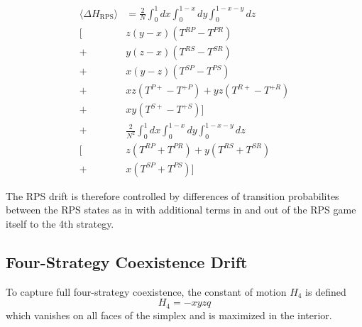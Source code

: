 \documentclass[%
 reprint,
 amsmath,amssymb,
 aps,
]{revtex4-2}
\begin{document}
\begin{align}
\langle \Delta H_{\mathrm{RPS}} \rangle
&= \frac{2}{N} \int_{0}^{1}dx 
\int_{0}^{1-x}dy
\int_{0}^{1-x-y}dz \nonumber\\
\Big[ 
&z (y-x) (T^{RP} - T^{PR}) \nonumber\\
+& y (z-x) (T^{RS} - T^{SR}) \nonumber\\
+& x (y-z) (T^{SP} - T^{PS}) \nonumber\\
+& xz(T^{P+} - T^{+P}) + yz(T^{R+} - T^{+R}) \nonumber\\
+& xy(T^{S+} - T^{+S})
\Big] \nonumber\\
+& \frac{2}{N^2} \int_{0}^{1}dx \int_{0}^{1-x}dy
\int_{0}^{1-x-y}dz \nonumber\\
\Big[
&z(T^{RP} + T^{PR}) + y(T^{RS} + T^{SR}) \nonumber\\
+& x(T^{SP} + T^{PS})
\Big]
\end{align}

The RPS drift is therefore controlled by differences of 
transition probabilites between the RPS states as in 
\cite{rps_cyclic_jens} with additional terms in and out of the 
RPS game itself to the 4th strategy.




\subsection{Four-Strategy Coexistence Drift}

\par
To capture full four-strategy coexistence, the constant of motion $H_4$ is defined
\begin{equation}
H_4 = - x y z q 
\end{equation}
which vanishes on all faces of the simplex and is maximized in the interior.
\end{document}
